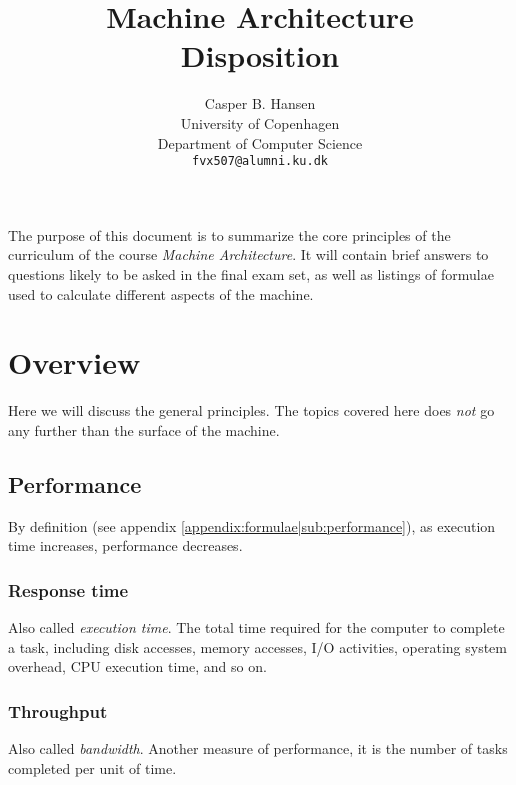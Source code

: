 \documentclass[11pt,a4paper]{article}
\title
{
	{\large Machine Architecture} \\
	Disposition	
}
\author
{
	Casper B. Hansen \\
	University of Copenhagen \\
	Department of Computer Science \\
	{\tt fvx507@alumni.ku.dk}
}
\newcommand{\appendixref}[1]{(see appendix \ref{#1})}
\begin{document}
\clearpage\maketitle\thispagestyle{empty}
\begin{multicols}{2}
\abstract
{
	\noindent
	The purpose of this document is to summarize the core principles of the
	curriculum of the course {\it Machine Architecture}. It will contain brief
	answers to questions likely to be asked in the final exam set, as well as
	listings of formulae used to calculate different aspects of the machine.
}
\vfill
\columnbreak
\tableofcontents
\end{multicols}

\newpage
\section{Overview}
Here we will discuss the general principles. The topics covered here does
{\it not} go any further than the surface of the machine.

\subsection{Performance}
By definition \appendixref{appendix:formulae|sub:performance}, as execution
time increases, performance decreases.

\begin{multicols}{2}
\subsubsection{Response time}
Also called {\it execution time}. The total time required for the computer to
complete a task, including disk accesses, memory accesses, I/O activities,
operating system overhead, CPU execution time, and so on.
\vfill
\columnbreak
\subsubsection{Throughput}
Also called {\it bandwidth}. Another measure of performance, it is the number
of tasks completed per unit of time.
\end{multicols}


\end{document}
